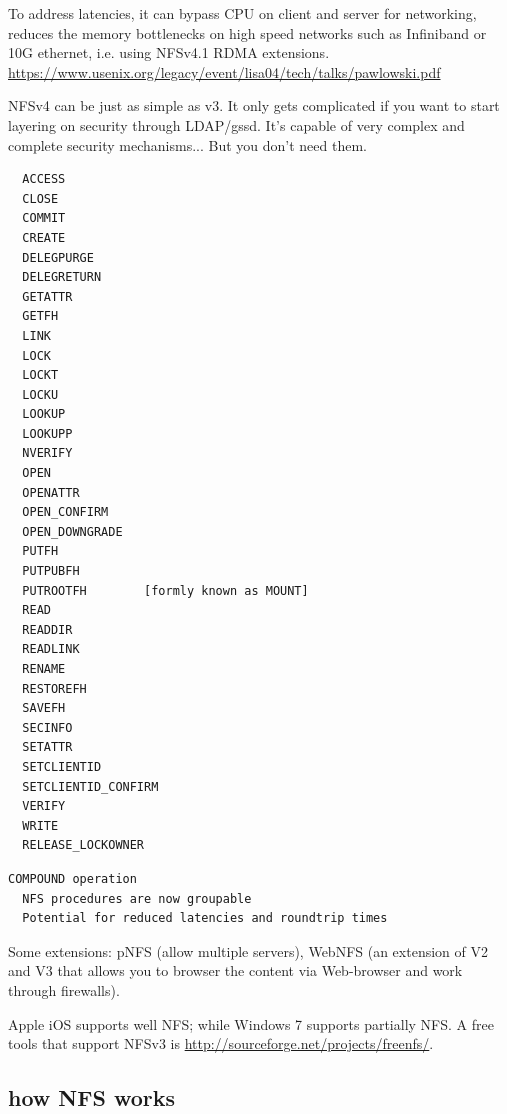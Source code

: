 \begin{enumerate}
  To address latencies, it can bypass CPU on client and server for networking,
  reduces the memory bottlenecks on high speed networks such as Infiniband or
  10G ethernet, i.e. using NFSv4.1 RDMA extensions.
  \url{https://www.usenix.org/legacy/event/lisa04/tech/talks/pawlowski.pdf}
   
  NFSv4 can be just as simple as v3. It only gets complicated if you want to
  start layering on security through LDAP/gssd. It's capable of very complex and
  complete security mechanisms... But you don't need them. 

\begin{verbatim}
  ACCESS
  CLOSE
  COMMIT
  CREATE
  DELEGPURGE
  DELEGRETURN
  GETATTR
  GETFH
  LINK
  LOCK
  LOCKT
  LOCKU
  LOOKUP
  LOOKUPP
  NVERIFY
  OPEN
  OPENATTR
  OPEN_CONFIRM
  OPEN_DOWNGRADE
  PUTFH
  PUTPUBFH
  PUTROOTFH        [formly known as MOUNT]
  READ
  READDIR
  READLINK
  RENAME
  RESTOREFH
  SAVEFH
  SECINFO
  SETATTR
  SETCLIENTID
  SETCLIENTID_CONFIRM
  VERIFY
  WRITE
  RELEASE_LOCKOWNER
\end{verbatim}  

\begin{verbatim}
COMPOUND operation
  NFS procedures are now groupable
  Potential for reduced latencies and roundtrip times
\end{verbatim}


\end{enumerate}

\begin{framed}
Some extensions: pNFS (allow multiple servers), WebNFS (an extension of V2
and V3 that allows you to browser the content via Web-browser and work
through firewalls).
\end{framed}

Apple iOS supports well NFS; while Windows 7 supports
partially NFS. A free tools that support NFSv3 is
\url{http://sourceforge.net/projects/freenfs/}.

\subsection{how NFS works}

